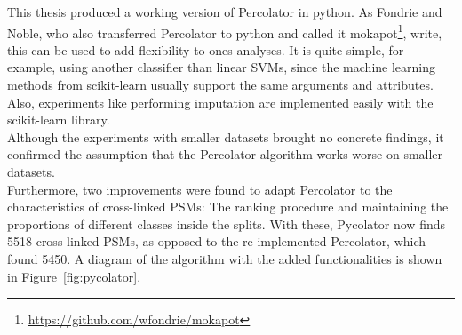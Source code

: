 This thesis produced a working version of Percolator in python. As Fondrie and Noble, who also transferred Percolator to python and called it mokapot\footnote{\url{https://github.com/wfondrie/mokapot}}, write, this can be used to add flexibility to ones analyses. It is quite simple, for example, using another classifier than linear SVMs, since the machine learning methods from scikit-learn usually support the same arguments and attributes. Also, experiments like performing imputation are implemented easily with the scikit-learn library.\\
Although the experiments with smaller datasets brought no concrete findings, it confirmed the assumption that the Percolator algorithm works worse on smaller datasets.\\
Furthermore, two improvements were found to adapt Percolator to the characteristics of cross-linked PSMs: The ranking procedure and maintaining the proportions of different classes inside the splits. With these, Pycolator now finds 5518 cross-linked PSMs, as opposed to the re-implemented Percolator, which found 5450. A diagram of the algorithm with the added functionalities is shown in Figure~\ref{fig:pycolator}. 
